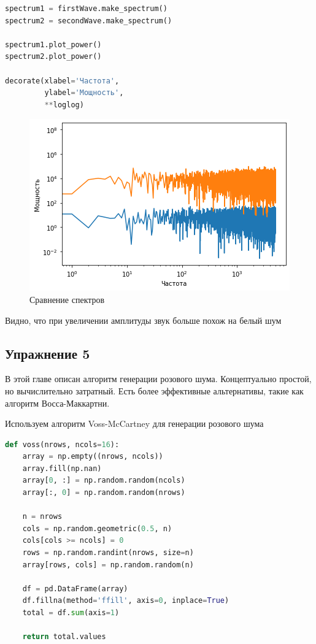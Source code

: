 \begin{lstlisting}[language=Python]
spectrum1 = firstWave.make_spectrum()
spectrum2 = secondWave.make_spectrum()

spectrum1.plot_power()
spectrum2.plot_power()

decorate(xlabel='Частота', 
         ylabel='Мощность', 
         **loglog)
\end{lstlisting}
\begin{figure}[H]
	\begin{center}
		\includegraphics[scale=1]{fig/lab04/lab04_6.png}
		\caption{Сравнение спектров}
	\end{center}
\end{figure}

Видно, что при увеличении амплитуды звук больше похож на белый шум

\subsection{Упражнение 5}

В этой главе описан алгоритм генерации розового шума. Концептуально простой, но вычислительно затратный. Есть более эффективные альтернативы, такие как алгоритм Восса-Маккартни.

Используем алгоритм Voss-McCartney для генерации розового шума

\begin{lstlisting}[language=Python]
def voss(nrows, ncols=16):
    array = np.empty((nrows, ncols))
    array.fill(np.nan)
    array[0, :] = np.random.random(ncols)
    array[:, 0] = np.random.random(nrows)
    
    n = nrows
    cols = np.random.geometric(0.5, n)
    cols[cols >= ncols] = 0
    rows = np.random.randint(nrows, size=n)
    array[rows, cols] = np.random.random(n)

    df = pd.DataFrame(array)
    df.fillna(method='ffill', axis=0, inplace=True)
    total = df.sum(axis=1)

    return total.values
\end{lstlisting}

